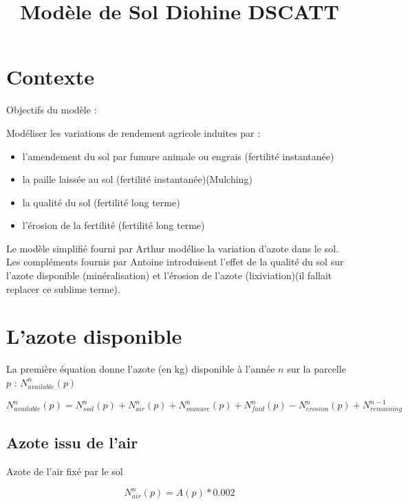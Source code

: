 \documentclass[10pt,a4paper,french]{article} %
\title{Modèle de Sol Diohine DSCATT}
\begin{document}
\maketitle


\section{Contexte}

Objectifs du modèle :


Modéliser les variations de rendement agricole induites par : 

\begin{itemize}
	\item l'amendement du sol par fumure animale ou engrais (fertilité instantanée)
	\item la paille laissée au sol (fertilité instantanée)(Mulching)
	\item la qualité du sol (fertilité long terme)
	\item l'érosion de la fertilité (fertilité long terme)
\end{itemize} 

\vspace{0.5cm}
Le modèle simplifié fourni par Arthur modélise la variation d'azote dans le sol. 
Les compléments fournis par Antoine introduisent l'effet de la qualité du sol sur l'azote disponible (minéralisation) et l'érosion de l'azote (lixiviation)(il fallait replacer ce sublime terme). 



\section{L'azote disponible}



La première équation donne l'azote (en kg) disponible à l'année $n$ sur la parcelle $p$ : $N_{available}^{n}(p)$

\begin{equation}
N_{available}^{n}(p)=N_{soil}^{n}(p)+N_{air}^{n}(p)+N_{manure}^{n}(p)+N_{faid}^{n}(p)-N_{erosion}^n(p) + N_{remaining}^{n-1}
\end{equation}


\subsection{Azote issu de l'air}


Azote de l'air fixé par le sol

\begin{equation}
N_{air}^{n}(p) = A(p) * 0.002
\end{equation}
\end{document}
